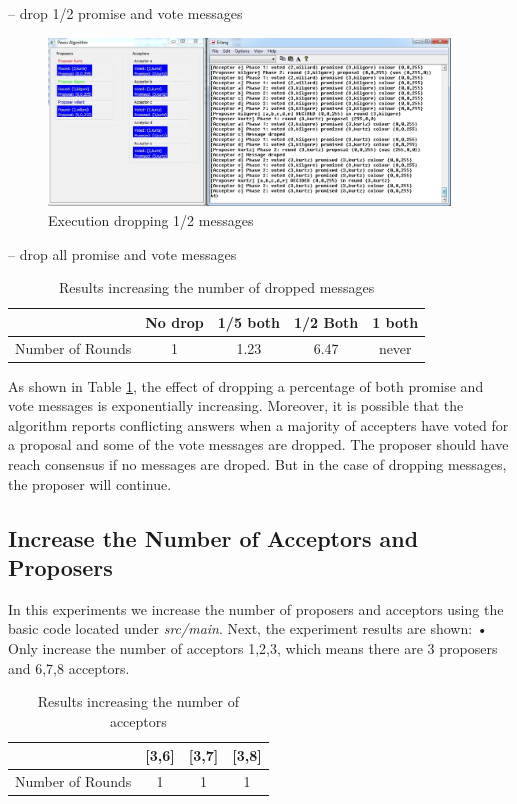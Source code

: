 – drop 1/2 promise and vote messages
\begin{figure}[h!]
  \centering
    \includegraphics[width=0.95\textwidth]{./3_Experiments/images/drop_2.jpg}
    \caption{Execution dropping 1/2 messages \label{fig:drop_2}}
\end{figure}

– drop all promise and vote messages

\begin{table}[h!]
  \centering
  \begin{tabular}{ |c | c | c | c | c |}
    \hline
                     & No drop & 1/5 both & 1/2 Both & 1 both \\ \hline
    Number of Rounds & 1 & 1.23 & 6.47 & never  \\ \hline
  \end{tabular}
  \caption{Results increasing the number of dropped messages}
  \label{table:6}
\end{table}
As shown in Table \ref{table:6}, the effect of dropping a percentage of both promise and vote messages
is exponentially increasing. Moreover, it is possible that the algorithm reports
conflicting answers when a majority of accepters have voted for a proposal and
some of the vote messages are dropped. The proposer should have reach consensus 
if no messages are droped. But in the case of dropping messages, the proposer will continue.

\subsection{Increase the Number of Acceptors and Proposers}
In this experiments we increase the number of proposers and acceptors using the
basic code located under \textit{src/main}. 
Next, the experiment results are shown:\newline
• Only increase the number of acceptors 1,2,3, which means there are 3
proposers and 6,7,8 acceptors.\newline
\begin{table}[h!]
  \centering
  \begin{tabular}{ |c | c | c | c | }
    \hline
                     & [3,6] & [3,7] & [3,8] \\ \hline
    Number of Rounds & 1 & 1 & 1  \\ \hline
  \end{tabular}
  \caption{Results increasing the number of acceptors}
  \label{table:7}
\end{table}

